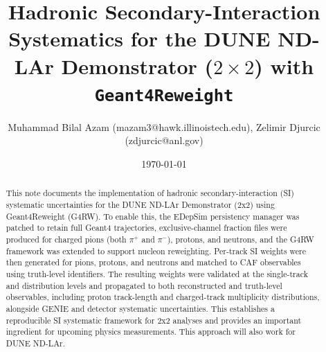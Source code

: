 \documentclass[%
article,
nofootinbib
]{revtex4-2}
\begin{document}
\title{Hadronic Secondary-Interaction Systematics for the DUNE ND-LAr Demonstrator ($2\times2$) with \texttt{Geant4Reweight}}

\author{Muhammad Bilal Azam ({mazam3@hawk.illinoistech.edu}), Zelimir Djurcic ({zdjurcic@anl.gov})}

\date{\today}

\begin{abstract}
This note documents the implementation of hadronic secondary-interaction (SI) systematic uncertainties for the DUNE ND-LAr Demonstrator (2x2) using Geant4Reweight (G4RW). To enable this, the EDepSim persistency manager was patched to retain full Geant4 trajectories,  exclusive-channel fraction files were produced for charged pions (both $\pi^+$ and $\pi^-$), protons, and neutrons, and the G4RW framework was extended to support nucleon reweighting. Per-track SI weights were then generated for pions, protons, and neutrons and matched to CAF observables using truth-level identifiers. The resulting weights were validated at the single-track and distribution levels and propagated to both reconstructed and truth-level observables, including proton track-length and charged-track multiplicity distributions, alongside GENIE and detector systematic uncertainties. This establishes a reproducible SI systematic framework for 2x2 analyses and provides an important ingredient for upcoming physics measurements. This approach will also work for DUNE ND-LAr. 

\end{abstract}

\vspace{40pt}
\maketitle

\end{document}
